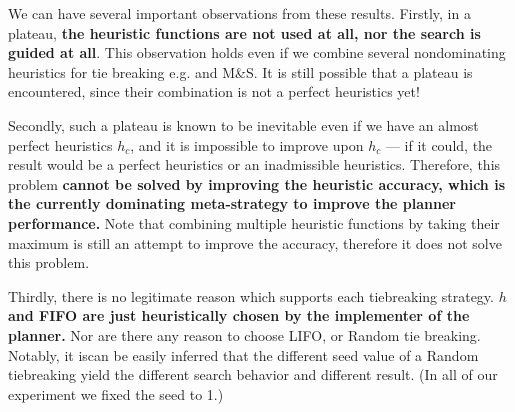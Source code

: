 % 


We can have several important observations from these results.  Firstly, in a plateau, \textbf{the heuristic functions are not used at all, nor the search is guided at all}. This observation holds even if we combine several nondominating heuristics for tie breaking e.g. \lmcut and M\&S.  It is still possible that a plateau is encountered, since their combination is not a perfect heuristics yet!

Secondly, such a plateau is known to be inevitable even if we have an almost perfect heuristics $h_c$, and it is impossible to improve upon $h_c$ --- if it could, the result would be a perfect heuristics or an inadmissible heuristics. Therefore, this problem \textbf{cannot be solved by improving the heuristic accuracy, which is the currently dominating meta-strategy to improve the planner performance.}  Note that combining multiple heuristic functions by taking their maximum is still an attempt to improve the accuracy, therefore it does not solve this problem.

Thirdly, there is no legitimate reason which supports each tiebreaking strategy. \textbf{$h$ and FIFO are just heuristically chosen by the implementer of the planner.} Nor are there any reason to choose LIFO, or Random tie breaking. Notably, it iscan be easily inferred that the different seed value of a Random tiebreaking yield the different search behavior and different result. (In all of our experiment we fixed the seed to 1.)

